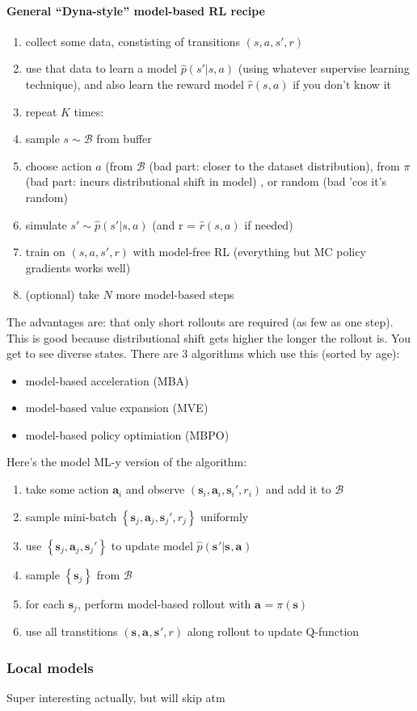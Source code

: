 \documentclass{report}
\begin{document}
\paragraph{General ``Dyna-style'' model-based RL recipe}
\begin{enumerate}
		\item collect some data, constisting of transitions $(s,a,s',r)$
		\item use that data to learn a model $\hat{p}(s'|s,a)$ (using whatever supervise learning technique), 
		and also learn the reward model $\hat{r}(s,a)$ if you don't know it
\item repeat $K$ times:
\item sample $s \sim \mathcal{B}$ from buffer
\item choose action $a$ (from $\mathcal{B}$ (bad part: closer to the dataset distribution), 
		from $\pi$ (bad part: incurs distributional shift in model) , or random (bad 'cos it's random)
\item simulate $s' \sim \hat{p}(s'|s,a)$ (and r = $\hat{r}(s,a)$ if needed)
\item train on $(s,a,s',r)$ with model-free RL (everything but MC policy gradients works well)
\item (optional) take $N$ more model-based steps
\end{enumerate}
The advantages are: that only short rollouts are required (as few as one step). 
This is good because distributional shift gets higher the longer the rollout is.
You get to see diverse states.
There are 3 algorithms which use this (sorted by age): 
\begin{itemize}
		\item model-based acceleration (MBA)
		\item model-based value expansion (MVE)
		\item model-based policy optimiation (MBPO)
\end{itemize}
Here's the model ML-y version of the algorithm:
\begin{enumerate}
		\item take some action $\bm{a}_{i}$ and observe $ \left( \bm{s}_{i}, \bm{a}_{i}, \bm{s}_{i}', r_i \right)   $ and add it to $ \mathcal{B}  $
		\item sample mini-batch $ \left\{  \bm{s}_{j}, \bm{a}_{j}, \bm{s}_{j}', r_j \right\}   $ uniformly
		\item use  $ \left\{  \bm{s}_{j}, \bm{a}_{j}, \bm{s}_{j}' \right\}   $ to update model $\hat{p} (\bm{s}_{}'|\bm{s}_{},\bm{a}_{})$
		\item sample $\left\{ \bm{s}_{j} \right\} $ from $ \mathcal{B}  $
		\item for each $\bm{s}_{j}$, perform model-based rollout with $\bm{a}_{} = \pi(\bm{s})$
		\item use all transtitions $ \left( \bm{s}_{}, \bm{a}_{}, \bm{s}_{}', r \right)   $ along rollout to update Q-function
\end{enumerate}

\subsubsection{Local models}
Super interesting actually, but will skip atm
\end{document}
